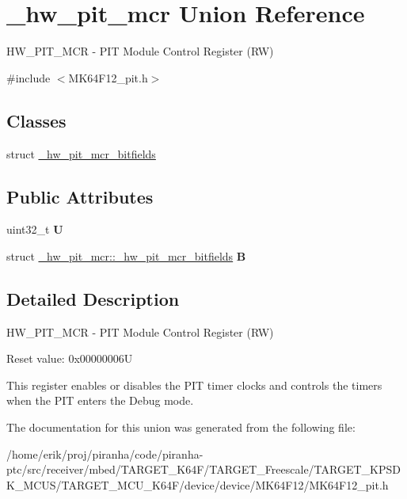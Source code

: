 \hypertarget{union__hw__pit__mcr}{}\section{\+\_\+hw\+\_\+pit\+\_\+mcr Union Reference}
\label{union__hw__pit__mcr}


H\+W\+\_\+\+P\+I\+T\+\_\+\+M\+CR -\/ P\+IT Module Control Register (RW)  




{\ttfamily \#include $<$M\+K64\+F12\+\_\+pit.\+h$>$}

\subsection*{Classes}
\begin{DoxyCompactItemize}
\item 
struct \hyperlink{struct__hw__pit__mcr_1_1__hw__pit__mcr__bitfields}{\+\_\+hw\+\_\+pit\+\_\+mcr\+\_\+bitfields}
\end{DoxyCompactItemize}
\subsection*{Public Attributes}
\begin{DoxyCompactItemize}
\item 
uint32\+\_\+t {\bfseries U}\hypertarget{union__hw__pit__mcr_a049cec710044e78d0794f56f3333ed7e}{}\label{union__hw__pit__mcr_a049cec710044e78d0794f56f3333ed7e}

\item 
struct \hyperlink{struct__hw__pit__mcr_1_1__hw__pit__mcr__bitfields}{\+\_\+hw\+\_\+pit\+\_\+mcr\+::\+\_\+hw\+\_\+pit\+\_\+mcr\+\_\+bitfields} {\bfseries B}\hypertarget{union__hw__pit__mcr_af76676f7cb28f070960d4485841bff34}{}\label{union__hw__pit__mcr_af76676f7cb28f070960d4485841bff34}

\end{DoxyCompactItemize}


\subsection{Detailed Description}
H\+W\+\_\+\+P\+I\+T\+\_\+\+M\+CR -\/ P\+IT Module Control Register (RW) 

Reset value\+: 0x00000006U

This register enables or disables the P\+IT timer clocks and controls the timers when the P\+IT enters the Debug mode. 

The documentation for this union was generated from the following file\+:\begin{DoxyCompactItemize}
\item 
/home/erik/proj/piranha/code/piranha-\/ptc/src/receiver/mbed/\+T\+A\+R\+G\+E\+T\+\_\+\+K64\+F/\+T\+A\+R\+G\+E\+T\+\_\+\+Freescale/\+T\+A\+R\+G\+E\+T\+\_\+\+K\+P\+S\+D\+K\+\_\+\+M\+C\+U\+S/\+T\+A\+R\+G\+E\+T\+\_\+\+M\+C\+U\+\_\+\+K64\+F/device/device/\+M\+K64\+F12/M\+K64\+F12\+\_\+pit.\+h\end{DoxyCompactItemize}
